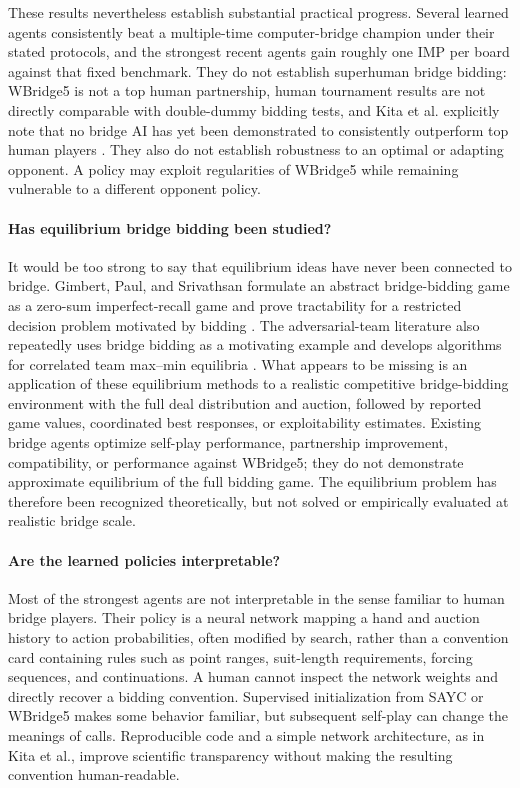 \documentclass[11pt]{article}
\begin{document}
These results nevertheless establish substantial practical progress. Several learned agents consistently beat a multiple-time computer-bridge champion under their stated protocols, and the strongest recent agents gain roughly one IMP per board against that fixed benchmark. They do not establish superhuman bridge bidding: WBridge5 is not a top human partnership, human tournament results are not directly comparable with double-dummy bidding tests, and Kita et al. explicitly note that no bridge AI has yet been demonstrated to consistently outperform top human players \cite{kita2024simple}. They also do not establish robustness to an optimal or adapting opponent. A policy may exploit regularities of WBridge5 while remaining vulnerable to a different opponent policy.

\paragraph{Has equilibrium bridge bidding been studied?}
It would be too strong to say that equilibrium ideas have never been connected to bridge. Gimbert, Paul, and Srivathsan formulate an abstract bridge-bidding game as a zero-sum imperfect-recall game and prove tractability for a restricted decision problem motivated by bidding \cite{gimbert2020bridge}. The adversarial-team literature also repeatedly uses bridge bidding as a motivating example and develops algorithms for correlated team max--min equilibria \cite{farina2018coordination,carminati2022marriage,zhang2023teambelief,mcaleer2023teampsro}. What appears to be missing is an application of these equilibrium methods to a realistic competitive bridge-bidding environment with the full deal distribution and auction, followed by reported game values, coordinated best responses, or exploitability estimates. Existing bridge agents optimize self-play performance, partnership improvement, compatibility, or performance against WBridge5; they do not demonstrate approximate equilibrium of the full bidding game. The equilibrium problem has therefore been recognized theoretically, but not solved or empirically evaluated at realistic bridge scale.

\paragraph{Are the learned policies interpretable?}
Most of the strongest agents are not interpretable in the sense familiar to human bridge players. Their policy is a neural network mapping a hand and auction history to action probabilities, often modified by search, rather than a convention card containing rules such as point ranges, suit-length requirements, forcing sequences, and continuations. A human cannot inspect the network weights and directly recover a bidding convention. Supervised initialization from SAYC or WBridge5 makes some behavior familiar, but subsequent self-play can change the meanings of calls. Reproducible code and a simple network architecture, as in Kita et al., improve scientific transparency without making the resulting convention human-readable.
\end{document}
